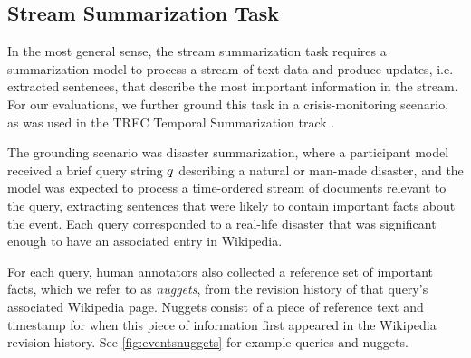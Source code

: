 \subsection{Stream Summarization Task}

In the most general sense, the stream summarization task requires a 
summarization model to process a stream of text data and produce updates,
i.e. extracted sentences, that describe the most important information in the
stream. For our evaluations, we further ground this task in a crisis-monitoring
scenario, as was used in the TREC Temporal Summarization track 
\citep{aslam2015trec}.

The grounding scenario was disaster
summarization, where a participant model received a brief query string 
$q{}$ describing a natural or man-made disaster, and the model was 
expected to process a time-ordered stream of documents relevant to the query, 
extracting sentences that were likely to contain important facts about the
event. Each query corresponded to a real-life disaster that was significant
enough to have an associated entry in Wikipedia.








For each query, human annotators also collected a reference set of important 
facts, which we refer to as \textit{nuggets}, 
from the revision history of that query's associated Wikipedia page. 
Nuggets consist of a piece of reference text and timestamp for when this piece
of information first appeared in the Wikipedia revision history. 
See \autoref{fig:eventsnuggets} for example queries and nuggets.




